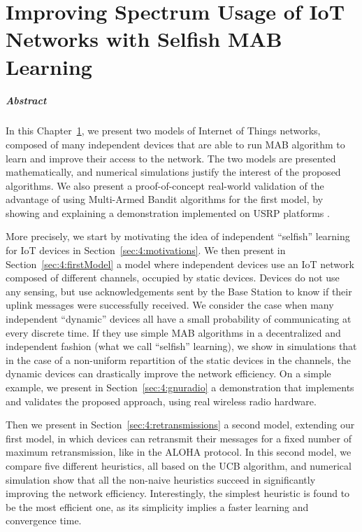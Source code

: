 
\chapter{Improving Spectrum Usage of IoT Networks with Selfish MAB Learning}
\label{chapter:4}
\minitoc

\paragraph{Abstract}

In this Chapter~\ref{chapter:4}, we present two models of Internet of Things networks, composed of many independent devices that are able to run MAB algorithm to learn and improve their access to the network.
The two models are presented mathematically, and numerical simulations justify the interest of the proposed algorithms.
We also present a proof-of-concept real-world validation of the advantage of using Multi-Armed Bandit algorithms for the first model, by showing and explaining a demonstration implemented on USRP platforms \cite{USRPDocumentation}.

More precisely, we start by motivating the idea of independent ``selfish'' learning for IoT devices in Section~\ref{sec:4:motivations}.
We then present in Section~\ref{sec:4:firstModel} a model where independent devices use an IoT network composed of different channels, occupied by static devices.
Devices do not use any sensing, but use acknowledgements sent by the Base Station to know if their uplink messages were successfully received.
We consider the case when many independent ``dynamic'' devices all have a small probability of communicating at every discrete time. If they use simple MAB algorithms in a decentralized and independent fashion (what we call ``selfish'' learning),
we show in simulations that in the case of a non-uniform repartition of the static devices in the channels, the dynamic devices can drastically improve the network efficiency.
%
On a simple example, we present in Section~\ref{sec:4:gnuradio} a demonstration that implements and validates the proposed approach, using real wireless radio hardware.

Then we present in Section~\ref{sec:4:retransmissions} a second model, extending our first model, in which devices can retransmit their messages for a fixed number of maximum retransmission, like in the ALOHA protocol.
In this second model, we compare five different heuristics, all based on the UCB algorithm, and numerical simulation show that all the non-naive heuristics succeed in significantly improving the network efficiency.
Interestingly, the simplest heuristic is found to be the most efficient one, as its simplicity implies a faster learning and convergence time.


